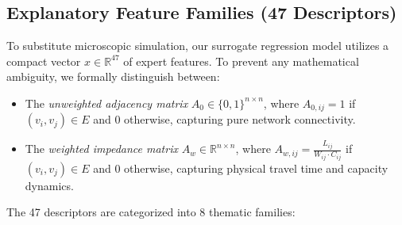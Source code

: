 \documentclass[lettersize,journal]{IEEEtran}
\begin{document}
\subsection{Explanatory Feature Families (47 Descriptors)}
To substitute microscopic simulation, our surrogate regression model utilizes a compact vector $x \in \mathbb{R}^{47}$ of expert features. To prevent any mathematical ambiguity, we formally distinguish between:
\begin{itemize}
    \item The \emph{unweighted adjacency matrix} $A_0 \in \{0, 1\}^{n \times n}$, where $A_{0, ij} = 1$ if $(v_i, v_j) \in E$ and $0$ otherwise, capturing pure network connectivity.
    \item The \emph{weighted impedance matrix} $A_w \in \mathbb{R}^{n \times n}$, where $A_{w, ij} = \frac{L_{ij}}{W_{ij} \cdot C_{ij}}$ if $(v_i, v_j) \in E$ and $0$ otherwise, capturing physical travel time and capacity dynamics.
\end{itemize}
The 47 descriptors are categorized into 8 thematic families:
\end{document}
